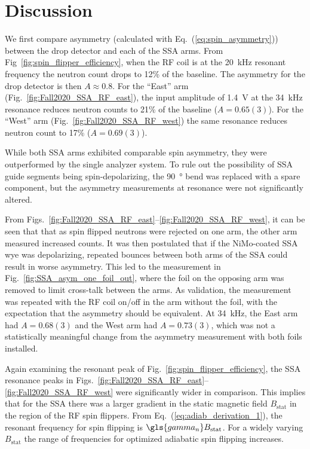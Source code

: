 
\section{Discussion}


We first compare asymmetry (calculated with Eq.~(\ref{eq:spin_asymmetry})) between the drop detector and each of the SSA arms. From Fig~\ref{fig:spin_flipper_efficiency}, when the RF coil is at the \qty{20}{kHz} resonant frequency the neutron count drops to 12\% of the baseline. The asymmetry for the drop detector is then $A\approx 0.8$. For the ``East'' arm (Fig.~\ref{fig:Fall2020_SSA_RF_east}), the input amplitude of \qty{1.4}{V} at the \qty{34}{kHz} resonance reduces neutron counts to 21\% of the baseline ($A=0.65(3)$). For the ``West'' arm (Fig.~\ref{fig:Fall2020_SSA_RF_west}) the same resonance reduces neutron count to 17\% ($A=0.69(3)$). 

While both SSA arms exhibited comparable spin asymmetry, they were outperformed by the single analyzer system. To rule out the possibility of SSA guide segments being spin-depolarizing, the \qty{90}{\degree} bend was replaced with a spare component, but the asymmetry measurements at resonance were not significantly altered.

From Figs.~\ref{fig:Fall2020_SSA_RF_east}--\ref{fig:Fall2020_SSA_RF_west}, it can be seen that that as spin flipped neutrons were rejected on one arm, the other arm measured increased counts. It was then postulated that if the NiMo-coated SSA wye was depolarizing, repeated \ucn bounces between both arms of the SSA could result in worse asymmetry. This led to the measurement in Fig.~\ref{fig:SSA_asym_one_foil_out}, where the foil on the opposing arm was removed to limit cross-talk between the arms. As validation, the measurement was repeated with the RF coil on/off in the arm without the foil, with the expectation that the asymmetry should be equivalent. At \qty{34}{kHz}, the East arm had $A=0.68(3)$ and the West arm had $A=0.73(3)$, which was not a statistically meaningful change from the asymmetry measurement with both foils installed.

Again examining the resonant peak of Fig.~\ref{fig:spin_flipper_efficiency}, the SSA resonance peaks in Figs.~\ref{fig:Fall2020_SSA_RF_east}--\ref{fig:Fall2020_SSA_RF_west} were significantly wider in comparison. This implies that for the SSA there was a larger gradient in the static magnetic field $B_\text{stat}$ in the region of the RF spin flippers. From Eq.~(\ref{eq:adiab_derivation_1}), the resonant frequency for spin flipping is $\gls{gamma_n} B_\text{stat}$. For a widely varying $B_\text{stat}$ the range of frequencies for optimized adiabatic spin flipping increases.

